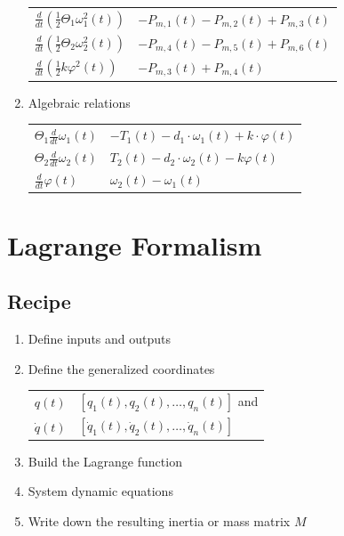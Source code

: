 \documentclass[10pt,a4paper]{scrartcl}
\begin{document}
\begin{multicols*}{3}
\begin{enumerate}
\vspace{3ex}

\begin{tabular}{l@{ = }l}
$\frac{d}{dt}\left(\frac{1}{2}\Theta_1\omega_1^2(t)\right)$&$-P_{m,1}(t)-P_{m,2}(t)+P_{m,3}(t)$\\
$\frac{d}{dt}\left(\frac{1}{2}\Theta_2\omega_2^2(t)\right)$&$-P_{m,4}(t)-P_{m,5}(t)+P_{m,6}(t)$\\
$\frac{d}{dt}\left(\frac{1}{2}k\varphi^2(t)\right)$&$-P_{m,3}(t)+P_{m,4}(t)$
\end{tabular}
\item Algebraic relations

\begin{tabular}{l@{ = }l}
$\Theta_1\frac{d}{dt} \omega_1(t)$&$-T_1(t)-d_1\cdot\omega_1(t)+k\cdot\varphi(t)$\\
$\Theta_2\frac{d}{dt}\omega_2(t)$&$T_2(t)-d_2\cdot\omega_2(t)-k\varphi(t)$\\
$\frac{d}{dt}\varphi(t)$&$\omega_2(t)-\omega_1(t)$
\end{tabular}
\end{enumerate}


\vfill
\null
\columnbreak

\section{Lagrange Formalism}

\subsection{Recipe}

\begin{enumerate}
\item Define inputs and outputs
\item Define the generalized coordinates

\begin{tabular}{l@{ = }l}
$q(t)$&$[q_1(t),q_2(t),\ldots,q_n(t)]$ and\\
$\dot{q}(t)$&$[\dot{q}_1(t),\dot{q}_2(t),\ldots,\dot{q}_n(t)]$
\end{tabular}
\item Build the Lagrange function
\item System dynamic equations
\item Write down the resulting inertia or mass matrix $M$
\end{enumerate}


\end{multicols*}
\end{document}
